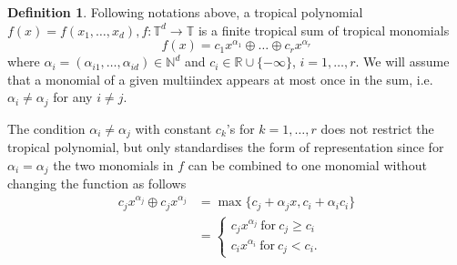 \documentclass{article}
\theoremstyle{definition}
\newtheorem{definition}[theorem]{Definition}
\begin{document}
\begin{definition}\label{tropPolyn}
\cite[p.~2]{zhang2018tropical}
Following notations above, a tropical polynomial $f(x)=f(x_1, \dots , x_d), f: \mathbb{T}^{d} \to \mathbb{T}$ is a finite tropical sum of tropical monomials 
$$ f(x)=c_1x^{\alpha_1} \oplus \dots \oplus c_rx^{\alpha_r}$$
where $\alpha_i = (\alpha_{i1}, \dots , \alpha_{id}) \in \mathbb{N}^{d}$ and $c_i \in \mathbb{R} \cup \{- \infty \}$, $i = 1, \dots , r$. We will assume that a monomial of a given multiindex appears at most once in the sum, i.e. $\alpha_i \neq \alpha_j$ for any $i \neq j$.
\end{definition}

The condition $\alpha_i \neq \alpha_j$ with constant $c_{k}$'s for $k=1, \dots , r$ does not restrict the tropical polynomial, but only standardises the form of representation since for $\alpha_{i} = \alpha_{j}$ the two monomials in $f$ can be combined to one monomial without changing the function as follows 
\begin{align*}
c_jx^{\alpha_j} \oplus c_jx^{\alpha_j} 
&= \max \{ c_{j} + \alpha_{j} x , c_{i} + \alpha_{i} c_{i} \} \\
&= \begin{cases} c_{j} x^{\alpha_{j}} \ \text{for} \ c_{j} \geq c_{i}\\
c_{i} x^{\alpha_{i}} \ \text{for} \ c_{j} < c_{i}.
\end{cases}
\end{align*}
\end{document}
